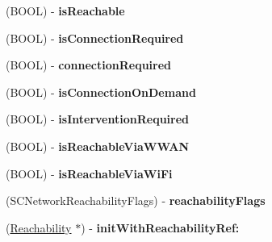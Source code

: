 \begin{DoxyCompactItemize}
\item 
\hypertarget{interface_reachability_ae0b18fcacc97f538502cf671aa583dbd}{
(\-B\-O\-O\-L) -\/ {\bfseries is\-Reachable}}
\label{interface_reachability_ae0b18fcacc97f538502cf671aa583dbd}

\item 
\hypertarget{interface_reachability_a294f9407cd32a05f26a480871df70901}{
(\-B\-O\-O\-L) -\/ {\bfseries is\-Connection\-Required}}
\label{interface_reachability_a294f9407cd32a05f26a480871df70901}

\item 
\hypertarget{interface_reachability_a731496d70dd8bfbd1b364df13cac2b4c}{
(\-B\-O\-O\-L) -\/ {\bfseries connection\-Required}}
\label{interface_reachability_a731496d70dd8bfbd1b364df13cac2b4c}

\item 
\hypertarget{interface_reachability_af5bea7c2cfd6439a4ff5f0ab0b92e37b}{
(\-B\-O\-O\-L) -\/ {\bfseries is\-Connection\-On\-Demand}}
\label{interface_reachability_af5bea7c2cfd6439a4ff5f0ab0b92e37b}

\item 
\hypertarget{interface_reachability_ad44af2ebf5ffd986dacad06e63362550}{
(\-B\-O\-O\-L) -\/ {\bfseries is\-Intervention\-Required}}
\label{interface_reachability_ad44af2ebf5ffd986dacad06e63362550}

\item 
\hypertarget{interface_reachability_a20011128b407d36659bc78a64cd583f5}{
(\-B\-O\-O\-L) -\/ {\bfseries is\-Reachable\-Via\-W\-W\-A\-N}}
\label{interface_reachability_a20011128b407d36659bc78a64cd583f5}

\item 
\hypertarget{interface_reachability_a994f39db8e47480480ffd7ee81159ecb}{
(\-B\-O\-O\-L) -\/ {\bfseries is\-Reachable\-Via\-Wi\-Fi}}
\label{interface_reachability_a994f39db8e47480480ffd7ee81159ecb}

\item 
\hypertarget{interface_reachability_ac9080e40006cd8c82431a668ec8bfe18}{
(\-S\-C\-Network\-Reachability\-Flags) -\/ {\bfseries reachability\-Flags}}
\label{interface_reachability_ac9080e40006cd8c82431a668ec8bfe18}

\item 
\hypertarget{interface_reachability_af8dbb23cc7f9ac59b0269dfaf83979fc}{
(\hyperlink{interface_reachability}{\-Reachability} $\ast$) -\/ {\bfseries init\-With\-Reachability\-Ref\-:}}
\label{interface_reachability_af8dbb23cc7f9ac59b0269dfaf83979fc}


\end{DoxyCompactItemize}
